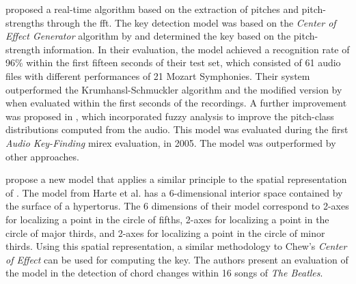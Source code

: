 \textcite{chuan2005polyphonic} proposed a real-time
algorithm based on the extraction of pitches and
pitch-strengths through the \acrfull{fft}. The key detection
model was based on the \emph{Center of Effect Generator}
algorithm by \textcite{chew2002spiral} and determined the
key based on the pitch-strength information. In their
evaluation, the model achieved a recognition rate of 96\%
within the first fifteen seconds of their test set, which
consisted of 61 audio files with different performances of
21 Mozart Symphonies. Their system outperformed the
Krumhansl-Schmuckler algorithm
\parencite{krumhansl1990cognitive} and the modified version
by \textcite{temperley1999whats} when evaluated within the
first seconds of the recordings. A further improvement was
proposed in \textcite{chuan2005fuzzy}, which incorporated
fuzzy analysis to improve the pitch-class distributions
computed from the audio. This model was evaluated during the
first \emph{Audio Key-Finding} \gls{mirex} evaluation, in
2005. The model was outperformed by other approaches.



\textcite{harte2006detecting} propose a new model that
applies a similar principle to the spatial representation of
\textcite{chew2000towards}. The model from Harte et al. has
a 6-dimensional interior space contained by the surface of a
hypertorus. The 6 dimensions of their model correspond to
2-axes for localizing a point in the circle of fifths,
2-axes for localizing a point in the circle of major thirds,
and 2-axes for localizing a point in the circle of minor
thirds. Using this spatial representation, a similar
methodology to Chew's \emph{Center of Effect}
\parencite{chew2002spiral} can be used for computing the
key. The authors present an evaluation of the model in the
detection of chord changes within 16 songs of \emph{The
Beatles}.


